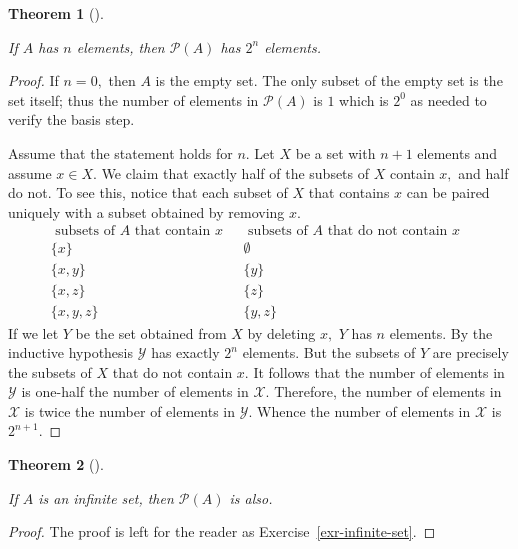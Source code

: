 \documentclass[
  letterpaper,
  10pt,
  reqno,
  twopage,
  openany]{book}
\theoremstyle{plain}
\theoremstyle{definition}
\theoremstyle{definition}
\theoremstyle{definition}
\theoremstyle{plain}
\theoremstyle{plain}
\newtheorem{theorem}{Theorem}[chapter]
\theoremstyle{remark}
\begin{document}
\leavevmode{}%
\begin{theorem}[]\label{thm-power-set-n}

If \(A\) has \(n\) elements, then \(\mathcal{P}(A)\) has \(2^n\)
elements.

\end{theorem}

\begin{proof}

If \(n=0,\) then \(A\) is the empty set. The only subset of the empty
set is the set itself; thus the number of elements in \(\mathcal{P}(A)\)
is \(1\) which is \(2^0\) as needed to verify the basis step.

Assume that the statement holds for \(n.\) Let \(X\) be a set with
\(n+1\) elements and assume \(x\in X.\) We claim that exactly half of
the subsets of \(X\) contain \(x,\) and half do not. To see this, notice
that each subset of \(X\) that contains \(x\) can be paired uniquely
with a subset obtained by removing \(x\). \[
\begin{matrix}
\text{ subsets of $A$ that contain $x$ }
&
\text{ subsets of $A$ that do not contain $x$ } 
\\ \hline
\{x\} & \emptyset \\
\{x,y\} & \{y\} \\
\{x,z\} & \{z\} \\
\{x,y,z\} & \{y,z\}
\end{matrix}
\] If we let \(Y\) be the set obtained from \(X\) by deleting \(x,\)
\(Y\) has \(n\) elements. By the inductive hypothesis \(\mathcal{Y}\)
has exactly \(2^n\) elements. But the subsets of \(Y\) are precisely the
subsets of \(X\) that do not contain \(x.\) It follows that the number
of elements in \(\mathcal{Y}\) is one-half the number of elements in
\(\mathcal{X}.\) Therefore, the number of elements in \(\mathcal{X}\) is
twice the number of elements in \(\mathcal{Y}.\) Whence the number of
elements in \(\mathcal{X}\) is \(2^{n+1}.\)

\end{proof}

\leavevmode{}%
\begin{theorem}[]\label{thm-infinite-set}

If \(A\) is an infinite set, then \(\mathcal{P}(A)\) is also.

\end{theorem}

\begin{proof}

The proof is left for the reader as Exercise~\ref{exr-infinite-set}.

\end{proof}
\end{document}
